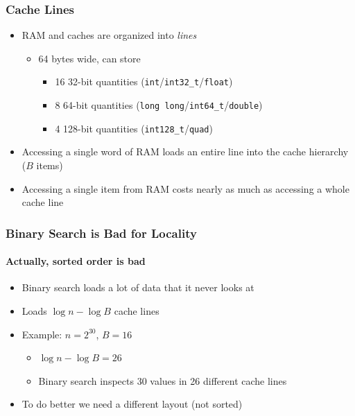 \documentclass[xcolor=dvipsnames]{beamer}
\newcommand{\mi}[1]{\multiinclude[<+>][start=1,format=pdf]{#1}}
\begin{document}
\begin{frame}
   \frametitle{Cache Lines}

   \begin{itemize}
      \item<+-> RAM and caches are organized into \emph{lines}
      \begin{itemize}
        \item<+-> 64 bytes wide, can store
        \begin{itemize}
        \item 16 32-bit quantities (\texttt{int}/\texttt{int32_t}/\texttt{float})
        \item 8 64-bit quantities (\texttt{long long}/\texttt{int64_t}/\texttt{double})
        \item 4 128-bit quantities (\texttt{int128_t}/\texttt{quad})
        \end{itemize}
      \end{itemize}
      \item<+-> Accessing a single word of RAM loads an entire line
         into the cache hierarchy ($B$ items)
   \end{itemize}
   \begin{center}
   \end{center}
   \begin{itemize}
        \item<+->Accessing a single item from RAM costs nearly as much as accessing a whole cache line
   \end{itemize}
\end{frame}

\begin{frame}
   \frametitle{Binary Search is Bad for Locality}
   \framesubtitle{Actually, sorted order is bad}

   \begin{itemize}
      \item<+->Binary search loads a lot of data that it never looks at
   \end{itemize}
   \begin{center}
      \mi{figs/binary-search-bad}%
   \end{center}
   \begin{itemize}
      \item<13->Loads $\log n - \log B$ cache lines
      \item<14->Example: $n =2^{30}$, $B=16$
      \begin{itemize}
          \item<15->$\log n - \log B=26$
          \item<16->Binary search inspects 30 values in 26 different cache lines
      \end{itemize}
      \item<17->To do better we need a different layout (not sorted)
   \end{itemize}
\end{frame}
\end{document}
